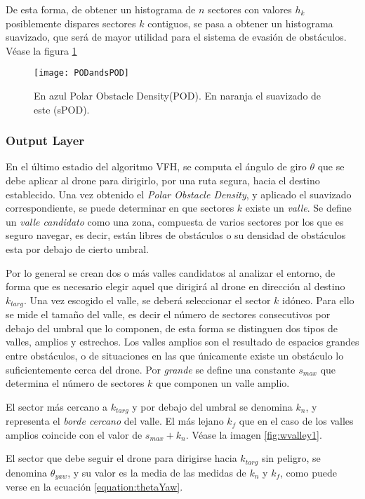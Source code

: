 De esta forma, de obtener un histograma de $n$ sectores con valores $h_k$ posiblemente dispares sectores $k$ contiguos, se pasa a obtener un histograma suavizado, que será de mayor utilidad para el sistema de evasión de obstáculos. Véase la figura \ref{fig:PODandsPOD}

 \begin{figure}[H]
	\centering
	\texttt{[image: PODandsPOD]}
	\caption{En azul Polar Obstacle Density(POD). En naranja el suavizado de este (sPOD).}\label{fig:PODandsPOD}
\end{figure}

\subsubsection{Output Layer}
\label{subsubsec:OL}
En el último estadio del algoritmo VFH, se computa el ángulo de giro $\theta$ que se debe aplicar al drone para dirigirlo, por una ruta segura, hacia el destino establecido.
Una vez obtenido el \textit{Polar Obstacle Density}, y aplicado el suavizado correspondiente, se puede determinar en que sectores $k$ existe un \textit{valle}. Se define un \textit{valle candidato} como una zona, compuesta de varios sectores por los que es seguro navegar, es decir, están libres de obstáculos o su densidad de obstáculos esta por debajo de cierto umbral. 

Por lo general se crean dos o más valles candidatos al analizar el entorno, de forma que es necesario elegir aquel que dirigirá al drone en dirección al destino $k_{targ}$. Una vez escogido el valle, se deberá seleccionar el sector $k$ idóneo. Para ello se mide el tamaño del valle, es decir el número de sectores consecutivos por debajo del umbral que lo componen, de esta forma se distinguen dos tipos de valles, amplios y estrechos. 
Los valles amplios son el resultado de espacios grandes entre obstáculos, o de situaciones en las que únicamente existe un obstáculo lo suficientemente cerca del drone. Por \textit{grande} se define una constante $s_{max}$ que determina el número de sectores $k$ que componen un valle amplio.

El sector más cercano a $k_{targ}$ y por debajo del umbral se denomina $k_n$, y representa el \textit{borde cercano} del valle. El más lejano $k_f$ que en el caso de los valles amplios coincide con el valor de $s_{max} + k_n$.  Véase la imagen \ref{fig:wvalley1}.

El sector que debe seguir el drone para dirigirse hacia $k_{targ}$ sin peligro, se denomina $\theta_{yaw}$, y su valor es la media de las medidas de $k_n$ y $k_f$, como puede verse en la ecuación \ref{equation:thetaYaw}.

